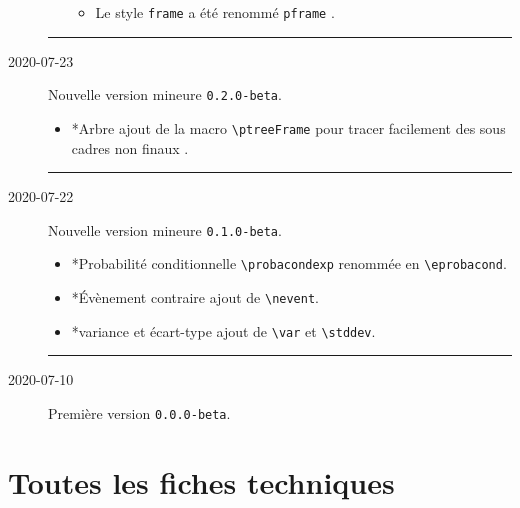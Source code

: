 \documentclass[12pt,a4paper]{article}
\makeatletter
\theoremstyle{definition}
\newcommand\topic{\@ifstar{\@topic@star}{\@topic@no@star}}
\newcommand\@topic@no@star[1]{%
    \textbf{\textsc{#1}.}%
}
\newcommand\@topic@star[1]{%
    \textbf{\textsc{#1} :}%
}
\newcommand\env[1]{\texttt{#1}}
\newcommand\macro[1]{\env{\textbackslash{}#1}}
\newcommand\separation{
    \medskip
    \hfill\rule{0.5\textwidth}{0.75pt}\hfill
    \medskip
}
\newcommand\prefix[1]{%
    \texttt{#1}%
}
\makeatother
\begin{document}
\begin{description}
\begin{itemize}[itemsep=.5em]
\begin{itemize}[itemsep=.5em]
            \item Le style \prefix{frame} a été renommé \prefix{pframe}.
        \end{itemize}
    \end{itemize}
    
    \separation

    \medskip
    \item[2020-07-23] Nouvelle version mineure \verb+0.2.0-beta+.
    
    \begin{itemize}[itemsep=.5em]
        \item \topic*{Arbre}
              ajout de la macro \macro{ptreeFrame} pour tracer facilement des sous cadres non \og finaux \fg.
    \end{itemize}
    
    \separation

    \medskip
    \item[2020-07-22] Nouvelle version mineure \verb+0.1.0-beta+.
    
    \begin{itemize}[itemsep=.5em]
        \item \topic*{Probabilité conditionnelle}
              \macro{probacondexp} renommée en  \macro{eprobacond}.
    
        \item \topic*{Évènement contraire}
              ajout de \macro{nevent}.
    
        \item \topic*{variance et écart-type}
              ajout de \macro{var} et \macro{stddev}.
    \end{itemize}
    
    \separation

    \medskip
    \item[2020-07-10] Première version \verb+0.0.0-beta+.

\end{description}


\newpage
\section{Toutes les fiches techniques} \label{techincal-ids}
\end{document}
